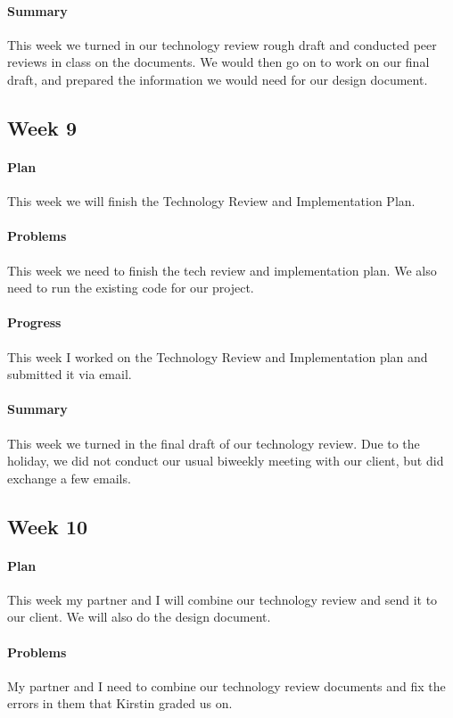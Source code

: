 \documentclass[onecolumn, draftclsnofoot,10pt, compsoc]{IEEEtran}
\begin{document}
\paragraph{Summary}
This week we turned in our technology review rough draft and conducted peer reviews in class on the documents. We would then go on to work on our final draft, and prepared the information we would need for our design document.

\subsection{Week 9}
\paragraph{Plan}
This week we will finish the Technology Review and Implementation Plan.
\paragraph{Problems}
This week we need to finish the tech review and implementation plan. We also need to run the existing code for our project.
\paragraph{Progress}
This week I worked on the Technology Review and Implementation plan and submitted it via email.
\paragraph{Summary}
This week we turned in the final draft of our technology review. Due to the holiday, we did not conduct our usual biweekly meeting with our client, but did exchange a few emails.

\subsection{Week 10}
\paragraph{Plan}
This week my partner and I will combine our technology review and send it to our client. We will also do the design document.
\paragraph{Problems}
My partner and I need to combine our technology review documents and fix the errors in them that Kirstin graded us on.
\end{document}

